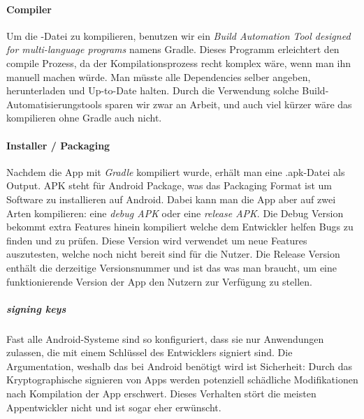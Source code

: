 \documentclass[a4paper,11pt]{article}
\begin{document}
\paragraph{Compiler}
Um die -Datei zu kompilieren, benutzen wir ein \textit{Build Automation Tool designed for multi-language programs} namens Gradle. Dieses Programm erleichtert den compile Prozess, da der Kompilationsprozess recht komplex wäre, wenn man ihn manuell machen würde. Man müsste alle Dependencies selber angeben, herunterladen und Up-to-Date halten. Durch die Verwendung solche Build-Automatisierungstools sparen wir zwar an Arbeit, und auch viel kürzer wäre das kompilieren ohne Gradle auch nicht.

\paragraph{Installer / Packaging}
Nachdem die App mit \textit{Gradle} kompiliert wurde, erhält man eine .apk-Datei als Output. APK steht für Android Package, was das Packaging Format ist um Software zu installieren auf Android. Dabei kann man die App aber auf zwei Arten kompilieren: eine \textit{debug APK} oder eine \textit{release APK}. Die Debug Version bekommt extra Features hinein kompiliert welche dem Entwickler helfen Bugs zu finden und zu prüfen. Diese Version wird verwendet um neue Features auszutesten, welche noch nicht bereit sind für die Nutzer. Die Release Version enthält die derzeitige Versionsnummer und ist das was man braucht, um eine funktionierende Version der App den Nutzern zur Verfügung zu stellen.

\subparagraph{signing keys}
Fast alle Android-Systeme sind so konfiguriert, dass sie nur Anwendungen zulassen, die mit einem Schlüssel des Entwicklers signiert sind. Die Argumentation, weshalb das bei Android benötigt wird ist Sicherheit: Durch das Kryptographische signieren von Apps werden potenziell schädliche Modifikationen nach Kompilation der App erschwert. Dieses Verhalten stört die meisten Appentwickler nicht und ist sogar eher erwünscht.\\
\end{document}
